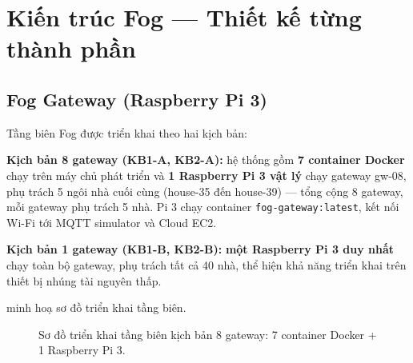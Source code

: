 \documentclass[13pt,a4paper]{report}
\newcommand{\code}[1]{\texttt{\small #1}}
\begin{document}
\section{Kiến trúc Fog --- Thiết kế từng thành phần}

\subsection{Fog Gateway (Raspberry Pi 3)}
\label{sec:fog-gw}

Tầng biên Fog được triển khai theo hai kịch bản:

\textbf{Kịch bản 8 gateway (KB1-A, KB2-A):} hệ thống gồm \textbf{7 container Docker}
chạy trên máy chủ phát triển và \textbf{1 Raspberry Pi 3 vật lý} chạy gateway
gw-08, phụ trách 5 ngôi nhà cuối cùng (house-35 đến house-39) --- tổng cộng 8
gateway, mỗi gateway phụ trách 5 nhà. Pi 3 chạy container \code{fog-gateway:latest},
kết nối Wi-Fi tới MQTT simulator và Cloud EC2.

\textbf{Kịch bản 1 gateway (KB1-B, KB2-B):} \textbf{một Raspberry Pi 3 duy nhất}
chạy toàn bộ gateway, phụ trách tất cả 40 nhà, thể hiện khả năng triển khai trên
thiết bị nhúng tài nguyên thấp.

 minh hoạ sơ đồ triển khai tầng biên.

\begin{figure}[H]
\centering
{}
\caption{Sơ đồ triển khai tầng biên kịch bản 8 gateway: 7 container Docker + 1 Raspberry Pi 3.}
\label{fig:deploy-gw}
\end{figure}
\end{document}
